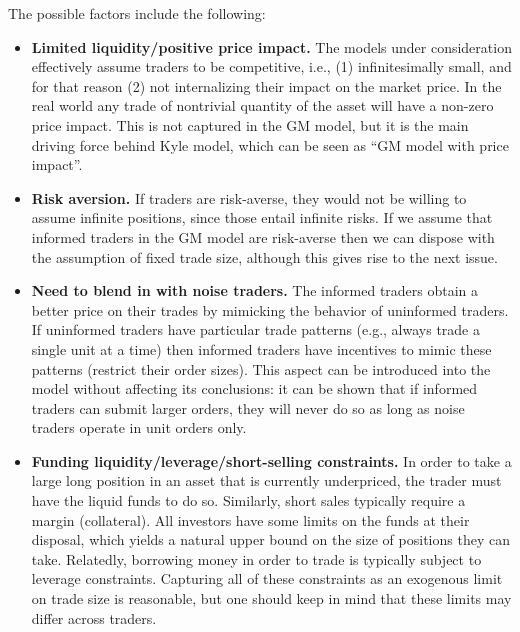 \begin{solution}
	
	The possible factors include the following:
	\begin{itemize}
		\item \textbf{Limited liquidity/positive price impact.} The models under consideration effectively assume traders to be competitive, i.e., (1) infinitesimally small, and for that reason (2) not internalizing their impact on the market price. In the real world any trade of nontrivial quantity of the asset will have a non-zero price impact. This is not captured in the GM model, but it is the main driving force behind Kyle model, which can be seen as ``GM model with price impact''.
		
		\item \textbf{Risk aversion.} If traders are risk-averse, they would not be willing to assume infinite positions, since those entail infinite risks. If we assume that informed traders in the GM model are risk-averse then we can dispose with the assumption of fixed trade size, although this gives rise to the next issue.
		
		\item \textbf{Need to blend in with noise traders.} The informed traders obtain a better price on their trades by mimicking the behavior of uninformed traders. If uninformed traders have particular trade patterns (e.g., always trade a single unit at a time) then informed traders have incentives to mimic these patterns (restrict their order sizes). This aspect can be introduced into the model without affecting its conclusions: it can be shown that if informed traders can submit larger orders, they will never do so as long as noise traders operate in unit orders only.
		
		\item \textbf{Funding liquidity/leverage/short-selling constraints.} In order to take a large long position in an asset that is currently underpriced, the trader must have the liquid funds to do so. Similarly, short sales typically require a margin (collateral). All investors have some limits on the funds at their disposal, which yields a natural upper bound on the size of positions they can take. Relatedly, borrowing money in order to trade is typically subject to leverage constraints. Capturing all of these constraints as an exogenous limit on trade size is reasonable, but one should keep in mind that these limits may differ across traders.
	\end{itemize}
\end{solution}




